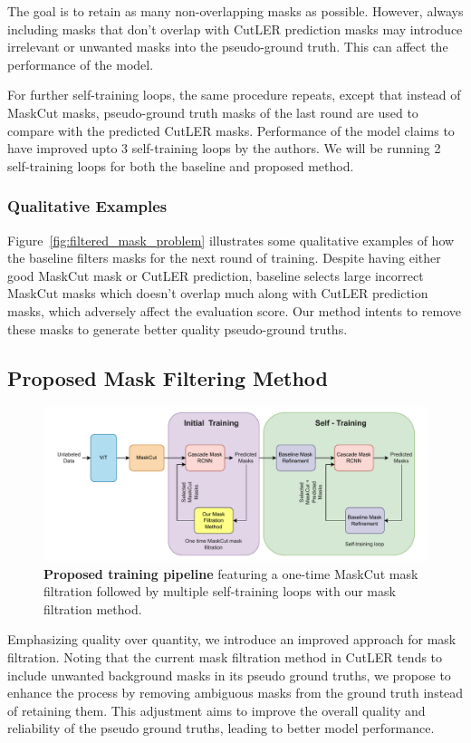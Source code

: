 The goal is to retain as many non-overlapping masks as possible. However, always including masks that don't overlap with CutLER prediction masks may introduce irrelevant or unwanted masks into the pseudo-ground truth. This can affect the performance of the model.

For further self-training loops, the same procedure repeats, except that instead of MaskCut masks, pseudo-ground truth masks of the last round are used to compare with the predicted CutLER masks. Performance of the model claims to have improved upto 3 self-training loops by the authors. We will be running 2 self-training loops for both the baseline and proposed method.

\subsubsection{Qualitative Examples}
Figure~\ref{fig:filtered_mask_problem} illustrates some qualitative examples of how the baseline filters masks for the next round of training. Despite having either good MaskCut mask or CutLER prediction, baseline selects large incorrect MaskCut masks which doesn't overlap much along with CutLER prediction masks, which adversely affect the evaluation score. Our method intents to remove these masks to generate better quality pseudo-ground truths.


\subsection{Proposed Mask Filtering Method}
\label{section:proposed_method}

\begin{figure}
	\centering
	\includegraphics[width=1\textwidth]{Images/main/our_approach.pdf}
	\caption[\textbf{Proposed Training Pipeline}]{\textbf{Proposed training pipeline} featuring a one-time MaskCut mask filtration followed by multiple self-training loops with our mask filtration method.}
	\label{fig:proposed_training}
\end{figure}
Emphasizing quality over quantity, we introduce an improved approach for mask filtration. Noting that the current mask filtration method in CutLER tends to include unwanted background masks in its pseudo ground truths, we propose to enhance the process by removing ambiguous masks from the ground truth instead of retaining them. This adjustment aims to improve the overall quality and reliability of the pseudo ground truths, leading to better model performance.

